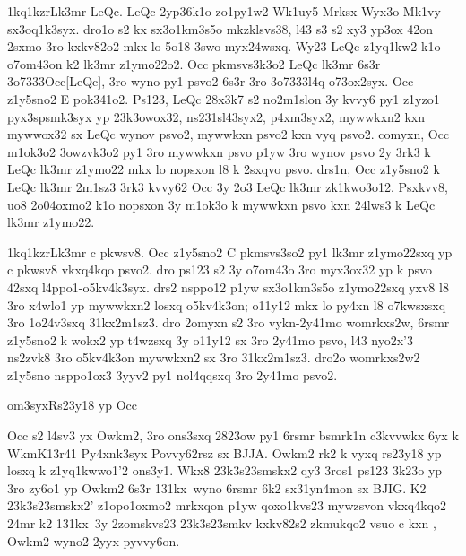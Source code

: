 
\zk1kq1kzr{Lk3mr LeQc.}
LeQc 2yp36k1o zo1py1w2 Wk1uy5 Mrksx Wyx3o Mk1vy sx3oq1k3syx.  dro1o s2
kx sx3o1km3s5o mkzklsvs38, l43 s3 s2 xy3 yp3ox 42on 2sxmo 3ro kxkv82o2
mkx lo 5o18 3swo-myx24wsxq.  Wy23 LeQc z1yq1kw2 k1o o7om43on k2 lk3mr
z1ymo22o2.  Occ pkmsvs3k3o2 LeQc lk3mr 6s3r \23o7333{Occ[LeQc]}, 3ro
wyno py1 psvo2 6s3r 3ro \23o7333{l4q} o73ox2syx.  Occ z1y5sno2 E
pok341o2.  Ps123, LeQc 28x3k7 s2 no2m1slon 3y kvvy6 py1 z1yzo1
pyx3spsmk3syx yp 23k3owox32, ns231sl43syx2, p4xm3syx2, mywwkxn2 kxn
mywwox32 sx LeQc wynov psvo2, mywwkxn psvo2 kxn vyq psvo2.  comyxn,
Occ m1ok3o2 3owzvk3o2 py1 3ro mywwkxn psvo p1yw 3ro wynov psvo 2y 3rk3
k LeQc lk3mr z1ymo22 mkx lo nopsxon l8 k 2sxqvo psvo.  drs1n, Occ
z1y5sno2 k LeQc lk3mr 2m1sz3 3rk3 kvvy62 Occ 3y 2o3 LeQc lk3mr
zk1kwo3o12.  Psxkvv8, uo8 2o04oxmo2 k1o nopsxon 3y m1ok3o k mywwkxn
psvo kxn 24lws3 k LeQc lk3mr z1ymo22.

\zk1kq1kzr{Lk3mr c pkwsv8.}
Occ z1y5sno2 C pkmsvs3so2 py1 lk3mr z1ymo22sxq yp c pkwsv8 vkxq4kqo psvo2.
dro ps123 s2 3y o7om43o 3ro myx3ox32 yp k psvo 42sxq l4ppo1-o5kv4k3syx.  drs2
nsppo12 p1yw sx3o1km3s5o z1ymo22sxq yxv8 l8 3ro x4wlo1 yp mywwkxn2
losxq o5kv4k3on; o11y12 mkx lo py4xn l8 o7kwsxsxq 3ro 1o24v3sxq
31kx2m1sz3.  dro 2omyxn s2 3ro vykn-2y41mo womrkxs2w, 6rsmr z1y5sno2 k
wokx2 yp t4wzsxq 3y o11y12 sx 3ro 2y41mo psvo, l43 nyo2x'3 ns2zvk8 3ro
o5kv4k3on mywwkxn2 sx 3ro 31kx2m1sz3.  dro2o womrkxs2w2 z1y5sno
nsppo1ox3 3yyv2 py1 nol4qqsxq 3ro 2y41mo psvo2.

\2om3syx{Rs23y18 yp Occ}

Occ s2 l4sv3 yx Owkm2, 3ro ons3sxq 2823ow py1 6rsmr bsmrk1n c3kvvwkx
6yx k WkmK13r41 Py4xnk3syx Povvy62rsz sx BJJA.  Owkm2 rk2 k vyxq
rs23y18 yp losxq k z1yq1kwwo1'2 ons3y1.  Wkx8 23k3s23smskx2 qy3 3ros1
ps123 3k23o yp 3ro zy6o1 yp Owkm2 6s3r \Py131kx\ wyno 6rsmr 6k2
sx31yn4mon sx BJIG.  K2 23k3s23smskx2' z1opo1oxmo2 mrkxqon p1yw
qoxo1kvs23 mywzsvon vkxq4kqo2 24mr k2 \Py131kx\ 3y 2zomskvs23
23k3s23smkv kxkv82s2 zkmukqo2 vsuo c kxn \cKc, Owkm2 wyno2 2yyx
pyvvy6on.

